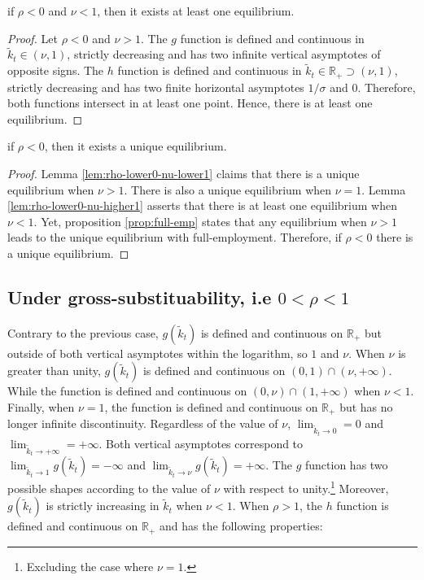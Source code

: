 \documentclass[
]{article}
\let\BeginKnitrBlock\begin \let\EndKnitrBlock\end
\begin{document}
\BeginKnitrBlock{lemma}
\protect\hypertarget{lem:rho-lower0-nu-higher1}{}{\label{lem:rho-lower0-nu-higher1} }if \(\rho < 0\) and \(\nu < 1\), then it exists at least one equilibrium.
\EndKnitrBlock{lemma}

\BeginKnitrBlock{proof}
\iffalse{} {Proof. } \fi{}Let \(\rho < 0\) and \(\nu > 1\). The \(g\) function is defined and continuous in \(\tilde{k}_t \in \left(\nu, 1\right)\), strictly decreasing and has two infinite vertical asymptotes of opposite signs. The \(h\) function is defined and continuous in \(\tilde{k}_t \in \mathbb{R}_+ \supset \left(\nu, 1\right)\), strictly decreasing and has two finite horizontal asymptotes \(1/\sigma\) and \(0\). Therefore, both functions intersect in at least one point. Hence, there is at least one equilibrium.
\EndKnitrBlock{proof}

\BeginKnitrBlock{proposition}
\protect\hypertarget{prp:rho-lower0}{}{\label{prp:rho-lower0} } if \(\rho < 0\), then it exists a unique equilibrium.
\EndKnitrBlock{proposition}

\BeginKnitrBlock{proof}
\iffalse{} {Proof. } \fi{}Lemma \ref{lem:rho-lower0-nu-lower1} claims that there is a unique equilibrium when \(\nu > 1\). There is also a unique equilibrium when \(\nu = 1\). Lemma \ref{lem:rho-lower0-nu-higher1} asserts that there is at least one equilibrium when \(\nu < 1\). Yet, proposition \ref{prop:full-emp} states that any equilibrium when \(\nu > 1\) leads to the unique equilibrium with full-employment. Therefore, if \(\rho < 0\) there is a unique equilibrium.
\EndKnitrBlock{proof}

\hypertarget{under-gross-substituability-i.e-0-rho-1}{%
\subsection{\texorpdfstring{Under gross-substituability, i.e \(0 < \rho < 1\)}{Under gross-substituability, i.e 0 \textless{} \textbackslash rho \textless{} 1}}\label{under-gross-substituability-i.e-0-rho-1}}

Contrary to the previous case, \(g(\tilde{k}_t)\) is defined and continuous on \(\mathbb{R}_+\) but outside of both vertical asymptotes within the logarithm, so \(1\) and \(\nu\). When \(\nu\) is greater than unity, \(g(\tilde{k}_t)\) is defined and continuous on \((0, 1) \cap (\nu, +\infty)\). While the function is defined and continuous on \((0, \nu) \cap (1, +\infty)\) when \(\nu < 1\). Finally, when \(\nu = 1\), the function is defined and continuous on \(\mathbb{R}_+\) but has no longer infinite discontinuity. Regardless of the value of \(\nu\), \(\lim_{\tilde{k}_t\to 0} = 0\) and \(\lim_{\tilde{k}_t\to +\infty} = +\infty\). Both vertical asymptotes correspond to \(\lim_{\tilde{k}_t\to 1} g(\tilde{k}_t) = -\infty\) and \(\lim_{\tilde{k}_t\to \nu} g(\tilde{k}_t) = +\infty\). The \(g\) function has two possible shapes according to the value of \(\nu\) with respect to unity.\footnote{Excluding the case where \(\nu=1\).} Moreover, \(g(\tilde{k}_t)\) is strictly increasing in \(\tilde{k}_t\) when \(\nu < 1\). When \(\rho > 1\), the \(h\) function is defined and continuous on \(\mathbb{R}_+\) and has the following properties:
\end{document}
